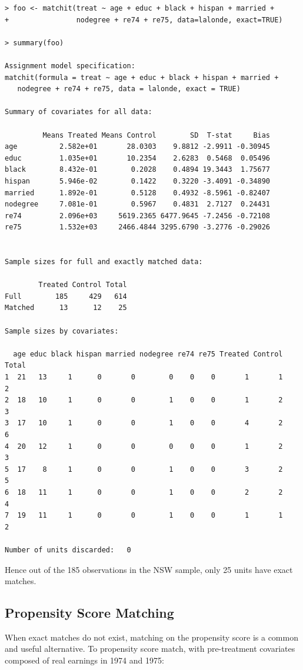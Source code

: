 \documentclass[oneside,letterpaper,titlepage]{article}
\begin{document}
\begin{verbatim}
> foo <- matchit(treat ~ age + educ + black + hispan + married +
+                nodegree + re74 + re75, data=lalonde, exact=TRUE)

> summary(foo)
 
Assignment model specification:
matchit(formula = treat ~ age + educ + black + hispan + married +  
   nodegree + re74 + re75, data = lalonde, exact = TRUE)
 
Summary of covariates for all data:
 
         Means Treated Means Control        SD  T-stat     Bias
age          2.582e+01       28.0303    9.8812 -2.9911 -0.30945
educ         1.035e+01       10.2354    2.6283  0.5468  0.05496
black        8.432e-01        0.2028    0.4894 19.3443  1.75677
hispan       5.946e-02        0.1422    0.3220 -3.4091 -0.34890
married      1.892e-01        0.5128    0.4932 -8.5961 -0.82407
nodegree     7.081e-01        0.5967    0.4831  2.7127  0.24431
re74         2.096e+03     5619.2365 6477.9645 -7.2456 -0.72108
re75         1.532e+03     2466.4844 3295.6790 -3.2776 -0.29026
 
 
Sample sizes for full and exactly matched data:
 
        Treated Control Total
Full        185     429   614
Matched      13      12    25
 
Sample sizes by covariates:
 
  age educ black hispan married nodegree re74 re75 Treated Control Total
1  21   13     1      0       0        0    0    0       1       1     2
2  18   10     1      0       0        1    0    0       1       2     3
3  17   10     1      0       0        1    0    0       4       2     6
4  20   12     1      0       0        0    0    0       1       2     3
5  17    8     1      0       0        1    0    0       3       2     5
6  18   11     1      0       0        1    0    0       2       2     4
7  19   11     1      0       0        1    0    0       1       1     2
 
Number of units discarded:   0
\end{verbatim}


Hence out of the 185 observations in the NSW sample, only 25 units
have exact matches.

\subsection{Propensity Score Matching}
When exact matches do not exist, matching on the propensity score is a
common and useful alternative.  To propensity score match, with
pre-treatment covariates composed of real earnings in 1974 and 1975:
\end{document}
